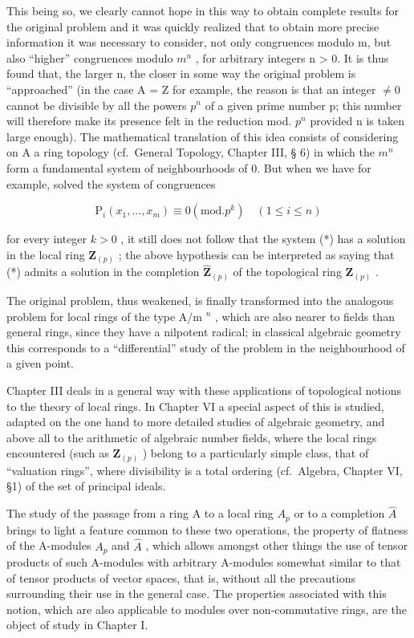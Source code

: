 This being so, we clearly cannot hope in this way to obtain complete results for the original problem and it was quickly realized that to obtain more precise information it was necessary to consider, not only congruences modulo m, but also ``higher'' congruences modulo \(m^{n}\) , for arbitrary integers n \textgreater{} 0. It is thus found that, the larger n, the closer in some way the original problem is ``approached'' (in the case A = Z for example, the reason is that an integer \(\neq 0\) cannot be divisible by all the powers \(p^{n}\) of a given prime number p; this number will therefore make its presence felt in the reduction mod. \(p^{n}\) provided n is taken large enough). The mathematical translation of this idea consists of considering on A a ring topology (cf.~General Topology, Chapter III, § 6) in which the \(m^{n}\) form a fundamental system of neighbourhoods of 0. But when we have for example, solved the system of congruences

\[
\mathrm{P} _ {i} (x _ {1}, \dots , x _ {m}) \equiv 0 (\mathrm{mod.} p ^ {k}) \quad (1 \leqslant i \leqslant n)\tag{**}
\]

for every integer \(k > 0\) , it still does not follow that the system (*) has a solution in the local ring \(\mathbf{Z}_{(p)}\) ; the above hypothesis can be interpreted as saying that (*) admits a solution in the completion \(\hat{\mathbf{Z}}_{(p)}\) of the topological ring \(\mathbf{Z}_{(p)}\) .

The original problem, thus weakened, is finally transformed into the analogous problem for local rings of the type A/m \(^{n}\) , which are also nearer to fields
than general rings, since they have a nilpotent radical; in classical algebraic geometry this corresponds to a ``differential'' study of the problem in the neighbourhood of a given point.

Chapter III deals in a general way with these applications of topological notions to the theory of local rings. In Chapter VI a special aspect of this is studied, adapted on the one hand to more detailed studies of algebraic geometry, and above all to the arithmetic of algebraic number fields, where the local rings encountered (such as \(\mathbf{Z}_{(p)}\) ) belong to a particularly simple class, that of ``valuation rings'', where divisibility is a total ordering (cf.~Algebra, Chapter VI, §1) of the set of principal ideals.

The study of the passage from a ring A to a local ring \(A_{p}\) or to a completion \(\hat{A}\) brings to light a feature common to these two operations, the property of flatness of the A-modules \(A_{p}\) and \(\hat{A}\) , which allows amongst other things the use of tensor products of such A-modules with arbitrary A-modules somewhat similar to that of tensor products of vector spaces, that is, without all the precautions surrounding their use in the general case. The properties associated with this notion, which are also applicable to modules over non-commutative rings, are the object of study in Chapter I.

